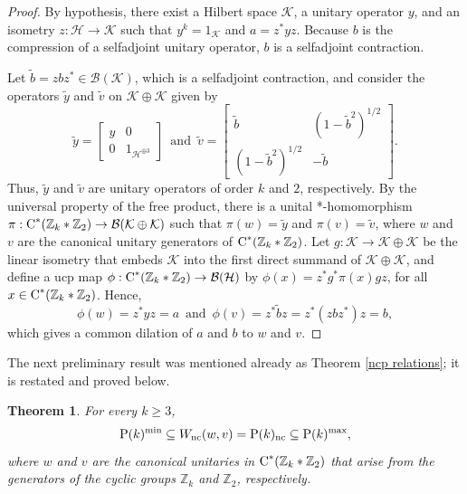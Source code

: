 \documentclass{amsart}
\newtheorem{theorem}{Theorem}[section]
\theoremstyle{definition}
\theoremstyle{remark}
\newcommand{\B}{\mathcal{B}}
\renewcommand{\H}{\mathcal{H}}
\newcommand{\K}{\mathcal K}
\newcommand\cstar{{\textrm C}^*}                              %
\numberwithin{equation}{section}
\begin{document}
\begin{proof} By hypothesis, there exist a Hilbert space $\K$, a unitary operator $y$, and an isometry $z:\H\rightarrow\K$
such that $y^k=1_\K$ and $a=z^*yz$. Because $b$ is the compression of a selfadjoint unitary operator,
$b$ is a selfadjoint contraction.

Let $\tilde b=zbz^*\in\B(\K)$, which is a selfadjoint contraction, and 
consider the operators $\tilde y$ and $\tilde v$ on $\K\oplus\K$ given by
\[
\tilde y = \left [\begin{array}{cc} y & 0  \\  0 & 1_{\H^{\oplus 3}} \end{array}   \right]
\,\mbox{ and }\,
\tilde v = \left [\begin{array}{cc} \tilde b & (1 -\tilde b^2)^{1/2}  \\  (1-\tilde b^2)^{1/2} & - \tilde b \end{array}   \right].
\]
Thus, $\tilde y$ and $\tilde v$ are unitary operators of order $k$ and $2$, respectively. By the universal property of the free product, 
there is a unital *-homomorphism $\pi:\cstar(\mathbb Z_k * \mathbb Z_2)\rightarrow\B(\K\oplus\K)$
such that $\pi(w)=\tilde y$ and $\pi(v)=\tilde v$, where $w$ and $v$ are the canonical unitary generators of 
$\cstar(\mathbb Z_k * \mathbb Z_2)$.
Let $g:\K\rightarrow\K\oplus\K$ be the linear isometry that embeds $\K$ into the first direct summand of $\K\oplus\K$,
and define a ucp map 
$\phi:\cstar(\mathbb Z_k * \mathbb Z_2)\rightarrow\B(\H)$ by $\phi(x)=z^*g^*\pi(x)gz$, for all $x\in \cstar(\mathbb Z_k * \mathbb Z_2)$. Hence,
\[
\phi(w)=z^*yz=a \,\mbox{ and }\, \phi(v)= z^*\tilde b z = z^*(zbz^*)z = b,
\]
which gives a common dilation of $a$ and $b$ to $w$ and $v$.
\end{proof}

The next preliminary result was mentioned already as Theorem \ref{ncp relations}; it is restated and proved below.

\begin{theorem}\label{ncp relations2}
For every $k\geq 3$, 
\[
\mbox{\textrm P}(k)^{\textrm{min}} \subseteq W_{\textrm{nc}}(w,v)= \mbox{\textrm P}(k)_{\textrm{nc}} \subseteq \mbox{\textrm P}(k)^{\textrm{max}},
\]
where $w$ and $v$ are the canonical unitaries in $\cstar(\mathbb Z_k * \mathbb Z_2)$ that arise from the generators 
of the cyclic groups $\mathbb Z_k$ and $\mathbb Z_2$, respectively. 
\end{theorem}
\end{document}
